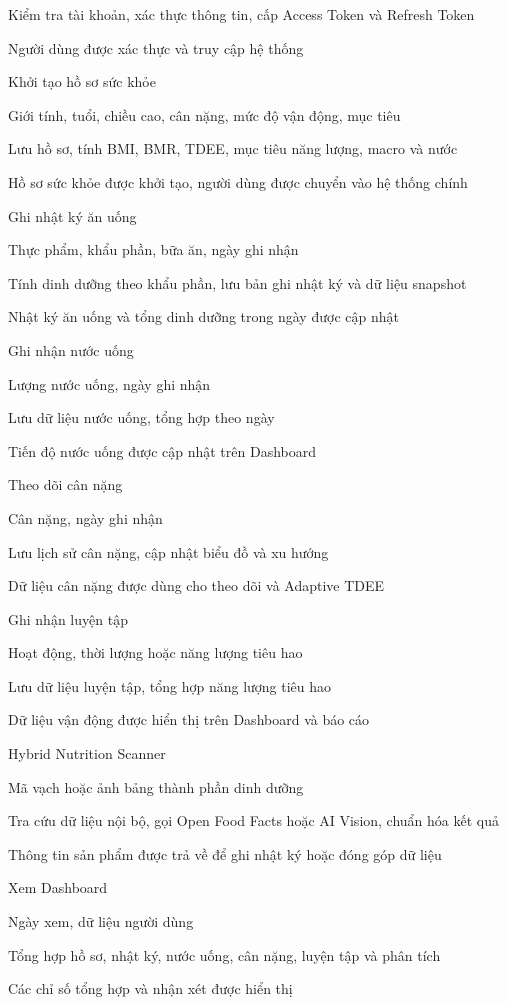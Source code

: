 Kiểm tra tài khoản, xác thực thông tin, cấp Access Token và Refresh Token

Người dùng được xác thực và truy cập hệ thống

Khởi tạo hồ sơ sức khỏe

Giới tính, tuổi, chiều cao, cân nặng, mức độ vận động, mục tiêu

Lưu hồ sơ, tính BMI, BMR, TDEE, mục tiêu năng lượng, macro và nước

Hồ sơ sức khỏe được khởi tạo, người dùng được chuyển vào hệ thống chính

Ghi nhật ký ăn uống

Thực phẩm, khẩu phần, bữa ăn, ngày ghi nhận

Tính dinh dưỡng theo khẩu phần, lưu bản ghi nhật ký và dữ liệu snapshot

Nhật ký ăn uống và tổng dinh dưỡng trong ngày được cập nhật

Ghi nhận nước uống

Lượng nước uống, ngày ghi nhận

Lưu dữ liệu nước uống, tổng hợp theo ngày

Tiến độ nước uống được cập nhật trên Dashboard

Theo dõi cân nặng

Cân nặng, ngày ghi nhận

Lưu lịch sử cân nặng, cập nhật biểu đồ và xu hướng

Dữ liệu cân nặng được dùng cho theo dõi và Adaptive TDEE

Ghi nhận luyện tập

Hoạt động, thời lượng hoặc năng lượng tiêu hao

Lưu dữ liệu luyện tập, tổng hợp năng lượng tiêu hao

Dữ liệu vận động được hiển thị trên Dashboard và báo cáo

Hybrid Nutrition Scanner

Mã vạch hoặc ảnh bảng thành phần dinh dưỡng

Tra cứu dữ liệu nội bộ, gọi Open Food Facts hoặc AI Vision, chuẩn hóa kết quả

Thông tin sản phẩm được trả về để ghi nhật ký hoặc đóng góp dữ liệu

Xem Dashboard

Ngày xem, dữ liệu người dùng

Tổng hợp hồ sơ, nhật ký, nước uống, cân nặng, luyện tập và phân tích

Các chỉ số tổng hợp và nhận xét được hiển thị

